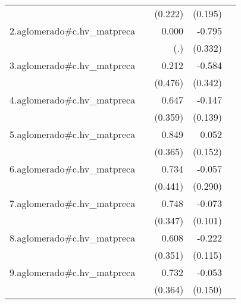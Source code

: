 {\begin{longtable}{l*{4}{D{.}{.}{-1}}}
            &                     &     (0.222)         &     (0.195)         &                     \\
\addlinespace
2.aglomerado#c.hv\_matpreca&                     &       0.000         &      -0.795\sym{*}  &                     \\
            &                     &         (.)         &     (0.332)         &                     \\
\addlinespace
3.aglomerado#c.hv\_matpreca&                     &       0.212         &      -0.584         &                     \\
            &                     &     (0.476)         &     (0.342)         &                     \\
\addlinespace
4.aglomerado#c.hv\_matpreca&                     &       0.647         &      -0.147         &                     \\
            &                     &     (0.359)         &     (0.139)         &                     \\
\addlinespace
5.aglomerado#c.hv\_matpreca&                     &       0.849\sym{*}  &       0.052         &                     \\
            &                     &     (0.365)         &     (0.152)         &                     \\
\addlinespace
6.aglomerado#c.hv\_matpreca&                     &       0.734         &      -0.057         &                     \\
            &                     &     (0.441)         &     (0.290)         &                     \\
\addlinespace
7.aglomerado#c.hv\_matpreca&                     &       0.748\sym{*}  &      -0.073         &                     \\
            &                     &     (0.347)         &     (0.101)         &                     \\
\addlinespace
8.aglomerado#c.hv\_matpreca&                     &       0.608         &      -0.222         &                     \\
            &                     &     (0.351)         &     (0.115)         &                     \\
\addlinespace
9.aglomerado#c.hv\_matpreca&                     &       0.732\sym{*}  &      -0.053         &                     \\
            &                     &     (0.364)         &     (0.150)         &                     \\

\end{longtable}}
